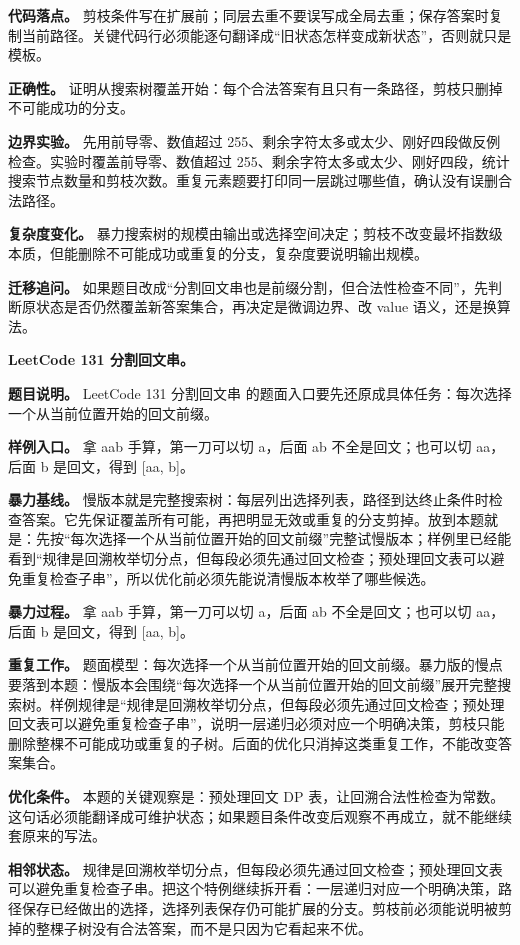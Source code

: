 \textbf{代码落点。} 剪枝条件写在扩展前；同层去重不要误写成全局去重；保存答案时复制当前路径。关键代码行必须能逐句翻译成“旧状态怎样变成新状态”，否则就只是模板。

\textbf{正确性。} 证明从搜索树覆盖开始：每个合法答案有且只有一条路径，剪枝只删掉不可能成功的分支。

\textbf{边界实验。} 先用前导零、数值超过 255、剩余字符太多或太少、刚好四段做反例检查。实验时覆盖前导零、数值超过 255、剩余字符太多或太少、刚好四段，统计搜索节点数量和剪枝次数。重复元素题要打印同一层跳过哪些值，确认没有误删合法路径。

\textbf{复杂度变化。} 暴力搜索树的规模由输出或选择空间决定；剪枝不改变最坏指数级本质，但能删除不可能成功或重复的分支，复杂度要说明输出规模。

\textbf{迁移追问。} 如果题目改成“分割回文串也是前缀分割，但合法性检查不同”，先判断原状态是否仍然覆盖新答案集合，再决定是微调边界、改 value 语义，还是换算法。

\noindent\textbf{LeetCode 131 分割回文串。}

\textbf{题目说明。} LeetCode 131 分割回文串 的题面入口要先还原成具体任务：每次选择一个从当前位置开始的回文前缀。

\textbf{样例入口。} 拿 aab 手算，第一刀可以切 a，后面 ab 不全是回文；也可以切 aa，后面 b 是回文，得到 [aa, b]。

\textbf{暴力基线。} 慢版本就是完整搜索树：每层列出选择列表，路径到达终止条件时检查答案。它先保证覆盖所有可能，再把明显无效或重复的分支剪掉。放到本题就是：先按“每次选择一个从当前位置开始的回文前缀”完整试慢版本；样例里已经能看到“规律是回溯枚举切分点，但每段必须先通过回文检查；预处理回文表可以避免重复检查子串”，所以优化前必须先能说清慢版本枚举了哪些候选。

\textbf{暴力过程。} 拿 aab 手算，第一刀可以切 a，后面 ab 不全是回文；也可以切 aa，后面 b 是回文，得到 [aa, b]。

\textbf{重复工作。} 题面模型：每次选择一个从当前位置开始的回文前缀。暴力版的慢点要落到本题：慢版本会围绕“每次选择一个从当前位置开始的回文前缀”展开完整搜索树。样例规律是“规律是回溯枚举切分点，但每段必须先通过回文检查；预处理回文表可以避免重复检查子串”，说明一层递归必须对应一个明确决策，剪枝只能删除整棵不可能成功或重复的子树。后面的优化只消掉这类重复工作，不能改变答案集合。

\textbf{优化条件。} 本题的关键观察是：预处理回文 DP 表，让回溯合法性检查为常数。这句话必须能翻译成可维护状态；如果题目条件改变后观察不再成立，就不能继续套原来的写法。

\textbf{相邻状态。} 规律是回溯枚举切分点，但每段必须先通过回文检查；预处理回文表可以避免重复检查子串。把这个特例继续拆开看：一层递归对应一个明确决策，路径保存已经做出的选择，选择列表保存仍可能扩展的分支。剪枝前必须能说明被剪掉的整棵子树没有合法答案，而不是只因为它看起来不优。


